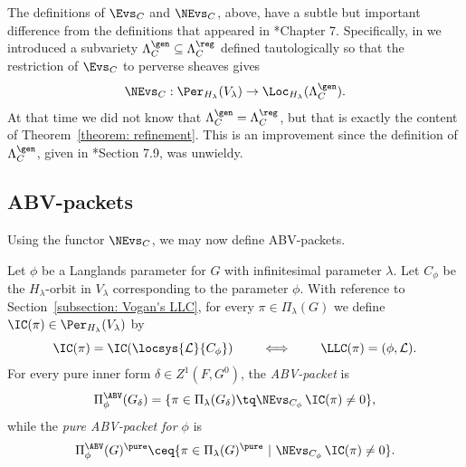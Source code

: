 \documentclass[11pt,letterpaper]{amsart}
\numberwithin{equation}{section}
\begin{document}
\begin{remark}\label{remark: Evs refinement}
    The definitions of $\Evs_C$ and $\NEvs_C$, above, have a subtle but important difference from the definitions that appeared in \cite{CFMMX22}*{Chapter 7}.
    Specifically, in \cite{CFMMX22} we introduced a subvariety $\Lambda_{C}^\gen \subseteq \Lambda_{C}^\reg$ defined tautologically so that the restriction of $\Evs_{C}$ to perverse sheaves gives
    \[
\NEvs_{C} : \Per_{H_\lambda}(V_\lambda) \to \Loc_{H_\lambda}(\Lambda_{C}^\gen).
\]
 At that time we did not know that $\Lambda_{C}^\gen = \Lambda_{C}^\reg$, but that is exactly the content of Theorem~\ref{theorem: refinement}. 
 This is an improvement since the definition of $\Lambda_{C}^\gen$, given in \cite{CFMMX22}*{Section 7.9}, was unwieldy.
\end{remark}



\subsection{ABV-packets}\label{subsection: ABV-packets}


Using the functor $\NEvs_C$, we may now define ABV-packets.

\begin{definition}\label{definition: ABV-packet}
    Let $\phi$ be a Langlands parameter for $G$ with infinitesimal parameter $\lambda$. Let $C_\phi$ be the $H_\lambda$-orbit in $V_\lambda$ corresponding to the parameter $\phi$.
    With reference to Section~\ref{subsection: Vogan's LLC}, for every $\pi \in \Pi_{\lambda}(G)$ we define $\IC(\pi)\in \Per_{H_\lambda}(V_\lambda)$ by
    \[
    \IC(\pi) = \IC(\locsys{\mathcal L}{C_\phi}) 
    \qquad\iff\qquad
    \LLC(\pi)=(\phi, \mathcal{L}).
    \]
For every pure inner form $\delta \in Z^1(F,G^0)$, the {\it ABV-packet} is     
\[
        \Pi_\phi^\ABV(G_\delta)
            =
            \{\pi \in \Pi_\lambda(G_\delta)
            \tq
            \NEvs_{C_\phi}\,
            \IC(\pi)\neq 0\},
    \]
while the {\it pure ABV-packet for $\phi$} is
    \[
    \Pi^\ABV_{\phi}(G)^{\pure} 
    \ceq
    \{\pi \in \Pi_\lambda(G)^\pure~\vert~ \NEvs_{C_\phi}\,
    \IC(\pi)\neq 0\}.\]
\end{definition}
\end{document}
